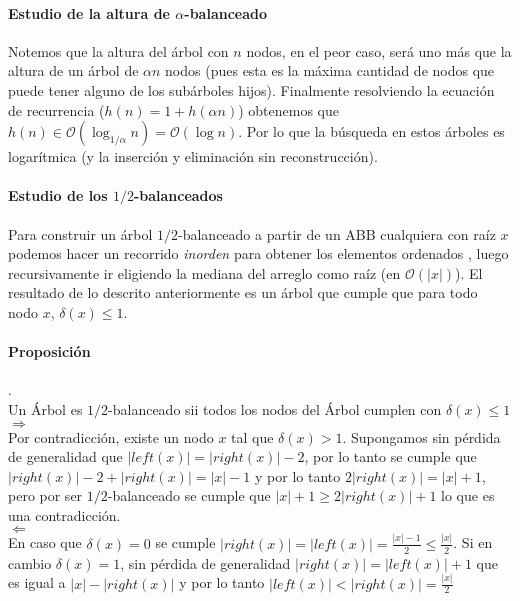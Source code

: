 \documentclass[dcc,uchile]{fcfmcourse}
\theoremstyle{plain}
\theoremstyle{definition}
\begin{document}
\begin{problems}
\paragraph{Estudio de la altura de $\alpha$-balanceado} Notemos que la altura del árbol con $n$ nodos, en el peor caso, será uno más que la altura de un árbol de $\alpha n$ nodos (pues esta es la máxima cantidad de nodos que puede tener alguno de los subárboles hijos). Finalmente resolviendo la ecuación de recurrencia ($h(n) = 1 + h(\alpha n)$) obtenemos que $h(n) \in \mathcal{O}(\log_{1/\alpha} n) = \mathcal{O}(\log n)$. Por lo que la búsqueda en estos árboles es logarítmica (y la inserción y eliminación sin reconstrucción).

\paragraph{Estudio de los $1/2$-balanceados} Para construir un árbol $1/2$-balanceado a partir de un ABB cualquiera con raíz $x$ podemos hacer un recorrido \textit{inorden} para obtener los elementos ordenados , luego recursivamente ir eligiendo la mediana del arreglo como raíz (en $\mathcal{O}(|x|)$). El resultado de lo descrito anteriormente es un árbol que cumple que para todo nodo $x$, $\delta(x)\le 1$.

\paragraph{Proposición}.
\\Un Árbol es $1/2$-balanceado sii todos los nodos del Árbol cumplen con $\delta(x)\le 1$\\

\underline{$\Rightarrow$}\\
Por contradicción, existe un nodo $x$ tal que $\delta(x)>1$. Supongamos sin pérdida de generalidad que $|left(x)| = |right(x)| - 2$, por lo tanto se cumple que $|right(x)| - 2 + |right(x)| = |x|-1$ y por lo tanto $2|right(x)| = |x|+1$, pero por ser $1/2$-balanceado se cumple que $|x|+1\ge 2|right(x)| + 1$ lo que es una contradicción.\\

\underline{$\Leftarrow$}\\
En caso que $\delta(x) = 0$ se cumple $|right(x)| = |left(x)| = \frac{|x|-1}{2} \le \frac{|x|}{2}$. Si en cambio $\delta(x) = 1$, sin pérdida de generalidad $|right(x)| = |left(x)| + 1$ que es igual a $|x| - |right(x)|$ y por lo tanto $|left(x)| < |right(x)| = \frac{|x|}{2}$
\end{problems}
 
\end{document}
